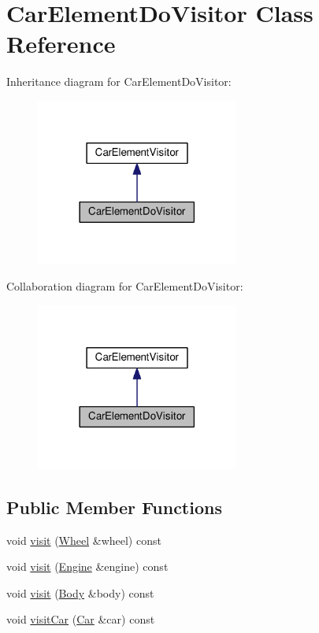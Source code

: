 \hypertarget{classCarElementDoVisitor}{}\section{Car\+Element\+Do\+Visitor Class Reference}
\label{classCarElementDoVisitor}


Inheritance diagram for Car\+Element\+Do\+Visitor\+:
\nopagebreak
\begin{figure}[H]
\begin{center}
\leavevmode
\includegraphics[width=189pt]{classCarElementDoVisitor__inherit__graph}
\end{center}
\end{figure}


Collaboration diagram for Car\+Element\+Do\+Visitor\+:
\nopagebreak
\begin{figure}[H]
\begin{center}
\leavevmode
\includegraphics[width=189pt]{classCarElementDoVisitor__coll__graph}
\end{center}
\end{figure}
\subsection*{Public Member Functions}
\begin{DoxyCompactItemize}
\item 
void \hyperlink{classCarElementDoVisitor_a2c3ed0ee25fa1d7664d86dccb7d3d0d0}{visit} (\hyperlink{classWheel}{Wheel} \&wheel) const 
\item 
void \hyperlink{classCarElementDoVisitor_a51693652a685ca770761d5716ca752da}{visit} (\hyperlink{classEngine}{Engine} \&engine) const 
\item 
void \hyperlink{classCarElementDoVisitor_a5e3d87f05da1d9726d9518ff67993d96}{visit} (\hyperlink{classBody}{Body} \&body) const 
\item 
void \hyperlink{classCarElementDoVisitor_a067a72ca642eb15ebd11f975f9be2891}{visit\+Car} (\hyperlink{classCar}{Car} \&car) const 
\end{DoxyCompactItemize}


